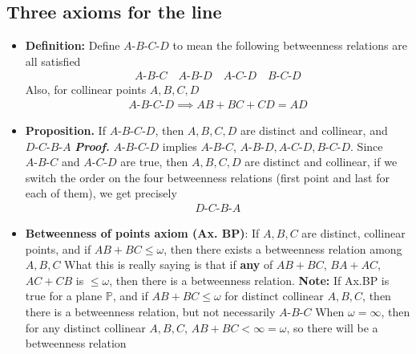 \documentclass{report}
\begin{document}
    \pagebreak 
    \subsection{Three axioms for the line}
    \begin{itemize}
        \item \textbf{Definition:} Define $A\text{-}B\text{-}C\text{-}D$ to mean the following betweenness relations are all satisfied
            \begin{align*}
                A\text{-}B\text{-}C \quad A\text{-}B\text{-}D \quad A\text{-}C\text{-}D \quad B\text{-}C\text{-}D 
            \end{align*}
            \bigbreak \noindent 
            Also, for collinear points $A,B,C,D$
            \begin{align*}
                A\text{-}B\text{-}C\text{-}D \implies AB + BC + CD = AD
            \end{align*}
        \item \textbf{Proposition.} If $A\text{-}B\text{-}C\text{-}D$, then $A,B,C,D$ are distinct and collinear, and $D\text{-}C\text{-}B\text{-}A $
            \bigbreak \noindent 
            \textbf{\textit{Proof.}} $A\text{-}B\text{-}C\text{-}D$ implies $ A\text{-}B\text{-}C$, $ A\text{-}B\text{-}D, A\text{-}C\text{-}D, B\text{-}C\text{-}D$. Since $ A\text{-}B\text{-}C$ and $ A\text{-}C\text{-}D$ are true, then $A,B,C,D$ are distinct and collinear, if we switch the order on the four betweenness relations (first point and last for each of them), we get precisely 
            \begin{align*}
                D\text{-}C\text{-}B\text{-}A
            \end{align*}
            \endpf
        \item \textbf{Betweenness of points axiom (Ax. BP)}: If $A,B,C$ are distinct, collinear points, and if $AB + BC \leq \omega$, then there exists a betweenness relation among $A,B,C$
            \bigbreak \noindent 
            What this is really saying is that if \textbf{any} of $AB + BC$, $BA + AC$, $AC + CB$ is $ \leq \omega$, then there is a betweenness relation.
            \bigbreak \noindent 
            \textbf{Note:} If Ax.BP is true for a plane $\mathbb{P}$, and if $AB + BC \leq \omega$ for distinct collinear $A,B,C$, then there is a betweenness relation, but not necessarily $ A\text{-}B\text{-}C $
            \bigbreak \noindent 
            When $\omega = \infty$, then for any distinct collinear $A,B,C$, $AB +BC  < \infty = \omega $, so there will be a betweenness relation

\end{itemize}
\end{document}
